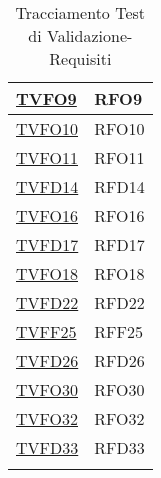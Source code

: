 \begin{longtable}{|>{\centering}m{5cm}|m{5cm}<{\centering}|}
\hyperlink{TVFO9}{TVFO9} & RFO9\\ \hline
\hyperlink{TVFO10}{TVFO10} & RFO10\\ \hline
\hyperlink{TVFO11}{TVFO11} & RFO11\\ \hline
\hyperlink{TVFD14}{TVFD14} & RFD14\\ \hline
\hyperlink{TVFO16}{TVFO16} & RFO16\\ \hline
\hyperlink{TVFD17}{TVFD17} & RFD17\\ \hline
\hyperlink{TVFO18}{TVFO18} & RFO18\\ \hline
\hyperlink{TVFD22}{TVFD22} & RFD22\\ \hline
\hyperlink{TVFF25}{TVFF25} & RFF25\\ \hline
\hyperlink{TVFD26}{TVFD26} & RFD26\\ \hline
\hyperlink{TVFO30}{TVFO30} & RFO30\\ \hline
\hyperlink{TVFO32}{TVFO32} & RFO32\\ \hline
\hyperlink{TVFD33}{TVFD33} & RFD33\\ \hline
\caption[Tracciamento Test di Validazione-Requisiti]{Tracciamento Test di Validazione-Requisiti}
\label{tabella:tv-requi}
\end{longtable}
\clearpage
